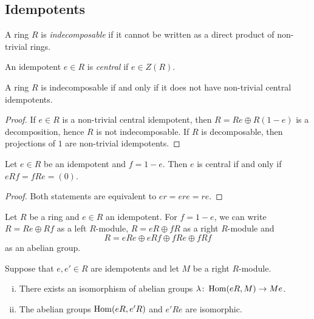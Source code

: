 \newpage

\subsection{Idempotents}

\begin{definicija}
A ring $R$ is \emph{indecomposable} if
it cannot be written as a direct product of non-trivial rings.
\end{definicija}

\begin{definicija}
An idempotent $e \in R$ is \emph{central}
if $e \in Z(R)$.
\end{definicija}

\begin{trditev}
A ring $R$ is indecomposable if and only if it does not have
non-trivial central idempotents.
\end{trditev}

\begin{proof}
If $e \in R$ is a non-trivial central idempotent, then
$R = Re \oplus R(1-e)$ is a decomposition, hence $R$ is not
indecomposable. If $R$ is decomposable, then projections of $1$ are
non-trivial idempotents.
\end{proof}

\begin{lema}
Let $e \in R$ be an idempotent and $f = 1-e$. Then $e$ is central
if and only if $e R f = f R e = (0)$.
\end{lema}

\begin{proof}
Both statements are equivalent to $er = ere = re$.
\end{proof}

\begin{definicija}
Let $R$ be a ring and $e \in R$ an idempotent. For $f = 1-e$, we
can write $R = Re \oplus Rf$ as a left $R$-module,
$R = eR \oplus fR$ as a right $R$-module and
\[
R = eRe \oplus eRf \oplus fRe \oplus fRf
\]
as an abelian group.
\end{definicija}


\begin{trditev}
Suppose that $e, e' \in R$ are idempotents and let $M$ be a right
$R$-module.

\begin{enumerate}[i)]
\item There exists an isomorphism of abelian groups
$\lambda \colon \operatorname{Hom}(eR, M) \to Me$.
\item The abelian groups $\operatorname{Hom}(eR, e'R)$ and $e'Re$ are isomorphic.
\end{enumerate}
\end{trditev}

